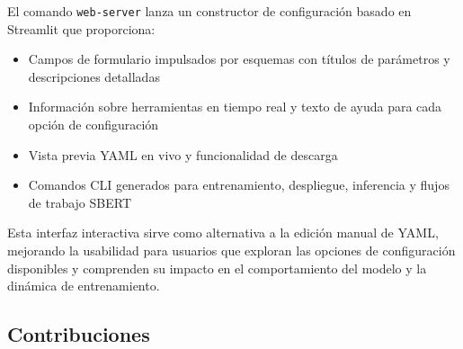 El comando \texttt{web-server} lanza un constructor de configuración basado en Streamlit que proporciona:
\begin{itemize}[leftmargin=*]
    \item Campos de formulario impulsados por esquemas con títulos de parámetros y descripciones detalladas
    \item Información sobre herramientas en tiempo real y texto de ayuda para cada opción de configuración
    \item Vista previa YAML en vivo y funcionalidad de descarga
    \item Comandos CLI generados para entrenamiento, despliegue, inferencia y flujos de trabajo SBERT
\end{itemize}

Esta interfaz interactiva sirve como alternativa a la edición manual de YAML, mejorando la usabilidad para usuarios que exploran las opciones de configuración disponibles y comprenden su impacto en el comportamiento del modelo y la dinámica de entrenamiento.

\subsection{Contribuciones}

